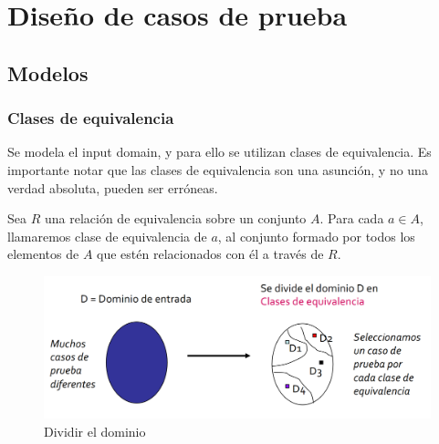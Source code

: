 \chapter{Diseño de casos de prueba}

\section{Modelos}

\subsection{Clases de equivalencia}

Se modela el input domain, y para ello se utilizan clases de equivalencia.
Es importante notar que las clases de equivalencia son una asunción, y no una verdad absoluta, pueden ser erróneas.
\begin{paracol}{2}
   
   Sea $R$ una relación de equivalencia sobre un
   conjunto $A$. Para cada $a \in A$, llamaremos
   clase de equivalencia de $a$, al conjunto
   formado por todos los elementos de $A$ que
   estén relacionados con él a través de $R$.
   
   \switchcolumn

   \begin{figure}[htbp]
      \centering
      \includegraphics{images/05/claseequivalencia.png}
      \caption{Dividir el dominio}
      \label{fig:05/claseequivalencia}
   \end{figure}
\end{paracol}

